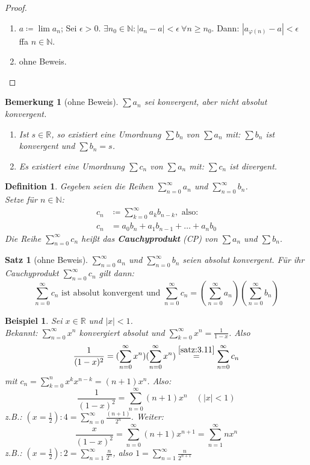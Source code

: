 \documentclass[titlepage,ngerman,a4paper,headsepline,DIV15,halfparskip*,14pt]{scrartcl}
\newcommand{\R}{\mathbb{R}}
\newcommand{\N}{\mathbb{N}}
\theoremstyle{dotless}
\newtheorem{satz}{Satz}[section]
\newtheorem*{definition}{Definition}
\newtheorem*{beispiel*}{Beispiel}
\newtheorem*{bemerkung}{Bemerkung}
\begin{document}
\begin{proof}
	\begin{enumerate}
		\item $a \coloneqq \lim a_{n}$; Sei $\epsilon > 0$. $\exists n_{0} \in \N: |a_{n} - a| < \epsilon ~\forall n \geq n_{0}$. Dann: $|a_{\varphi(n)} - a| < \epsilon$ ffa $n \in \N$.
		\item ohne Beweis.
	\end{enumerate}	
\end{proof}


\begin{bemerkung}[ohne Beweis]
	$\sum a_{n}$ sei konvergent, aber nicht absolut konvergent.
	\begin{enumerate}
		\item Ist $s \in \R$, so existiert eine Umordnung $\sum b_{n}$ von $\sum a_{n}$ mit: $\sum b_{n}$ ist konvergent und $\sum b_{n} = s$.
		\item Es existiert eine Umordnung $\sum c_{n}$ von $\sum a_{n}$ mit: $\sum c_{n}$ ist divergent.
	\end{enumerate}
\end{bemerkung}

\begin{definition}
	Gegeben seien die Reihen $\sum_{n=0}^{\infty} a_{n}$ und $\sum_{n=0}^{\infty} b_{n}$. \\
	Setze für $n \in \N$:
	\begin{align*}
		c_{n} & \coloneqq \sum_{k=0}^{\infty} a_{k} b_{n-k}, \text{ also: } \\
		c_{n} & = a_{0} b_{n} + a_{1} b_{n-1} + \dotsc + a_{n} b_{0}
	\end{align*} 
	Die Reihe $\sum_{n=0}^{\infty} c_{n}$ hei{\ss}t das \textbf{Cauchyprodukt} (CP) von $\sum a_{n}$ und $\sum b_{n}$.
\end{definition}


\begin{satz}[ohne Beweis] \label{satz:3.11}
$\sum_{n=0}^{\infty} a_{n}$ und $\sum_{n=0}^{\infty} b_{n}$ seien absolut konvergent. Für ihr Cauchyprodukt $\sum_{n=0}^{\infty} c_{n}$ gilt dann:
	$$ \sum_{n=0}^{\infty} c_{n} \text{ ist absolut konvergent und } \sum_{n=0}^{\infty} c_{n} = (\sum_{n=0}^{\infty} a_{n}) (\sum_{n=0}^{\infty} b_{n}) $$
\end{satz}


\begin{beispiel*}
	Sei $x \in \R$ und $|x | < 1$. \\
	Bekannt: $\sum_{n=0}^{\infty} x^{n}$ konvergiert absolut und	 $\sum_{k=0}^{\infty} x^{n} = \frac{1}{1-x}$. Also
	$$ \frac{1}{(1-x)^{2}} = (\sum_{n=0}^{\infty} x^{n})(\sum_{n=0}^{\infty} x^{n}) \overset{\ref{satz:3.11}}{=} \sum_{n=0}^{\infty} c_{n} $$
	mit $c_{n} = \sum_{k=0}^{n} x^{k} x^{n-k} = (n+1)x^{n}$. Also:
	$$ \frac{1}{(1-x)^{2}} = \sum_{n=0}^{\infty} (n+1) x^{n} \quad (|x| < 1) $$
	z.B.: $(x = \frac{1}{2}): 4 = \sum_{n=0}^{\infty} \frac{(n+1)}{2^{n}}$. Weiter:
	$$ \frac{x}{(1-x)^{2}} = \sum_{n=0}^{\infty} (n+1) x^{n+1} = \sum_{n=1}^{\infty} n x^{n} $$
	z.B.: $(x = \frac{1}{2}): 2 = \sum_{n=1}^{\infty} \frac{n}{2^{n}}$, also $1 = \sum_{n=1}^{\infty} \frac{n}{2^{n+1}}$
\end{beispiel*}
\end{document}

